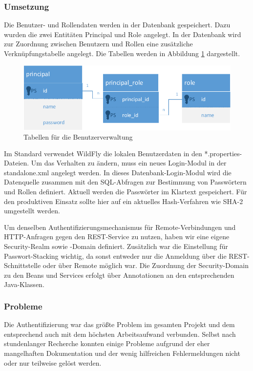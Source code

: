 \subsubsection{Umsetzung}
Die Benutzer- und Rollendaten werden in der Datenbank gespeichert. Dazu wurden die zwei Entitäten Principal und Role angelegt. In der Datenbank wird zur Zuordnung zwischen Benutzern und Rollen eine zusätzliche Verknüpfungstabelle angelegt. Die Tabellen werden in Abbildung \ref{fig:BenutzerRollen} dargestellt.

\begin{figure}[tbh]
\centering
\includegraphics[width=0.7\linewidth]{Bilder/BenutzerRollen}
\caption{Tabellen für die Benutzerverwaltung}
\label{fig:BenutzerRollen}
\end{figure}

Im Standard verwendet WildFly die lokalen Benutzerdaten in den *.properties-Dateien. Um das Verhalten zu ändern, muss ein neues Login-Modul in der standalone.xml angelegt werden. In dieses Datenbank-Login-Modul wird die Datenquelle zusammen mit den SQL-Abfragen zur Bestimmung von Passwörtern und Rollen definiert. Aktuell werden die Passwörter im Klartext gespeichert. Für den produktiven Einsatz sollte hier auf ein aktuelles Hash-Verfahren wie SHA-2 umgestellt werden.

Um denselben Authentifizierungsmechanismus für Remote-Verbindungen und HTTP-Anfragen gegen den REST-Service zu nutzen, haben wir eine eigene Security-Realm sowie -Domain definiert. Zusätzlich war die Einstellung für Passwort-Stacking wichtig, da sonst entweder nur die Anmeldung über die REST-Schnittstelle oder über Remote möglich war. Die Zuordnung der Security-Domain zu den Beans und Services erfolgt über Annotationen an den entsprechenden Java-Klassen. 

\subsubsection{Probleme}
Die Authentifizierung war das größte Problem im gesamten Projekt und dem entsprechend auch mit dem höchsten Arbeitsaufwand verbunden. Selbst nach stundenlanger Recherche konnten einige Probleme aufgrund der eher mangelhaften Dokumentation und der wenig hilfreichen Fehlermeldungen nicht oder nur teilweise gelöst werden.

